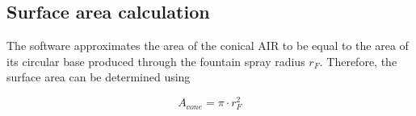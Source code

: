 \documentclass[utf8]{frontiersSCNS}
\begin{document}

\subsection{Surface area calculation} \label{sec:shape}

The software approximates the area of the conical AIR to be equal to the area of its circular base produced
through the fountain spray radius $r_F$. Therefore, the surface area can be determined using

\begin{equation} A_{cone} =\pi \cdot r_{F}^2 \label{eq:Area} \end{equation}
\end{document}
